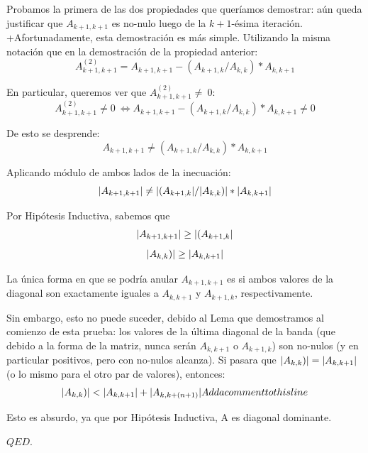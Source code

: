 \par Probamos la primera de las dos propiedades que quer\'iamos demostrar: a\'un queda justificar que $A_{k+1, k+1}$ es no-nulo luego de la $k+1$-\'esima iteraci\'on.
+Afortunadamente, esta demostraci\'on es m\'as simple. Utilizando la misma notaci\'on que en la demostraci\'on de la propiedad anterior:
\begin{equation}
A_{k+1, k+1}^{(2)} = A_{k+1, k+1} - (A_{k+1, k} / A_{k, k}) * A_{k, k+1}
\end{equation}
\par En particular, queremos ver que $A_{k+1, k+1}^{(2)}\neq\ 0$:
\begin{equation}
A_{k+1, k+1}^{(2)} \neq 0\ \iff A_{k+1, k+1} - (A_{k+1, k} / A_{k, k}) * A_{k, k+1} \neq 0
\end{equation}
\par De esto se desprende:
\begin{equation}
A_{k+1, k+1} \neq (A_{k+1, k} / A_{k, k}) * A_{k, k+1}
\end{equation}
\par Aplicando m\'odulo de ambos lados de la inecuaci\'on:
\begin{equation}
    \lvert A_{k+1, k+1}\rvert \neq \lvert(A_{k+1, k}\rvert / \lvert A_{k, k})\rvert * \lvert A_{k, k+1}\rvert
\end{equation}
\par Por Hip\'otesis Inductiva, sabemos que 
\begin{equation}
    \lvert A_{k+1, k+1}\rvert \geq \lvert(A_{k+1, k}\rvert 
\end{equation}
\begin{equation}
    \lvert A_{k, k})\rvert \geq \lvert A_{k, k+1}\rvert
\end{equation}
\par La \'unica forma en que se podr\'ia anular $A_{k+1, k+1}$ es si ambos valores de la diagonal son exactamente iguales a $A_{k, k+1}$ y $A_{k+1, k}$, respectivamente.
\par Sin embargo, esto no puede suceder, debido al Lema que demostramos al comienzo de esta prueba: los valores de la \'ultima diagonal de la banda (que debido a la forma de la matriz, nunca ser\'an
$A_{k, k+1}$ o $A_{k+1, k}$) son no-nulos (y en particular positivos, pero con no-nulos alcanza). Si pasara que $\lvert A_{k, k})\rvert = \lvert A_{k, k+1}\rvert$ (o lo mismo para el otro par de valores), entonces:
\begin{equation}
    \lvert A_{k, k})\rvert < \lvert A_{k, k+1}\rvert + \lvert A_{k, k+(n+1)}\rvert
Add a comment to this line
\end{equation}
\par Esto es absurdo, ya que por Hip\'otesis Inductiva, A es diagonal dominante.
\par $QED$.



